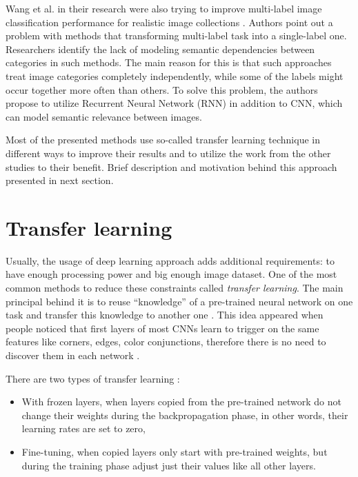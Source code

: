Wang et al. in their research were also trying to improve multi-label image classification performance for realistic image collections \cite{Wang2016CNN-RNN:Classification}. Authors point out a problem with methods that transforming multi-label task into a single-label one. Researchers identify the lack of modeling semantic dependencies between categories in such methods. The main reason for this is that such approaches treat image categories completely independently, while some of the labels might occur together more often than others. To solve this problem, the authors propose to utilize Recurrent Neural Network (RNN) in addition to CNN, which can model semantic relevance between images.

Most of the presented methods use so-called transfer learning technique in different ways to improve their results and to utilize the work from the other studies to their benefit. Brief description and motivation behind this approach presented in next section.



\section{Transfer learning}
\label{sec:transfer-learning}

Usually, the usage of deep learning approach adds additional requirements: to have enough processing power and big enough image dataset. One of the most common methods to reduce these constraints called \textit{transfer learning}. The main principal behind it is to reuse ``knowledge'' of a pre-trained neural network on one task and transfer this knowledge to another one \cite{Pan2010TransferLearningSurvey, Oquab2014TransferringMidLevel}. This idea appeared when people noticed that first layers of most CNNs learn to trigger on the same features like corners, edges, color conjunctions, therefore there is no need to discover them in each network \cite{Zeiler2014VisualizingNets}.

There are two types of transfer learning \cite{Yosinski2014HowTransferable}:
\begin{itemize}
    \item With frozen layers, when layers copied from the pre-trained network do not change their weights during the backpropagation phase, in other words, their learning rates are set to zero,
    \item Fine-tuning, when copied layers only start with pre-trained weights, but during the training phase adjust just their values like all other layers.
\end{itemize}

